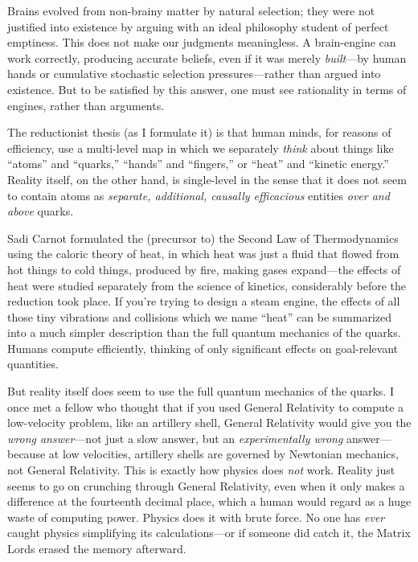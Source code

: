 {
 Brains evolved from non-brainy matter by natural selection; they
were not justified into existence by arguing with an ideal philosophy
student of perfect emptiness. This does not make our judgments
meaningless. A brain-engine can work correctly, producing accurate
beliefs, even if it was merely \textit{built}{}---by human hands or
cumulative stochastic selection pressures---rather than argued into
existence. But to be satisfied by this answer, one must see rationality
in terms of engines, rather than arguments.}

\myendsectiontext


{
 The reductionist thesis (as I formulate it) is that human minds,
for reasons of efficiency, use a multi-level map in which we separately
\textit{think} about things like
``atoms'' and
``quarks,''
``hands'' and
``fingers,'' or
``heat'' and
``kinetic energy.'' Reality itself,
on the other hand, is single-level in the sense that it does not seem
to contain atoms as \textit{separate, additional, causally efficacious}
entities \textit{over and above} quarks. }

{
 Sadi Carnot formulated the (precursor to) the Second Law of
Thermodynamics using the caloric theory of heat, in which heat was just
a fluid that flowed from hot things to cold things, produced by fire,
making gases expand---the effects of heat were studied separately from
the science of kinetics, considerably before the reduction took place.
If you're trying to design a steam engine, the effects
of all those tiny vibrations and collisions which we name
``heat'' can be summarized into a
much simpler description than the full quantum mechanics of the quarks.
Humans compute efficiently, thinking of only significant effects on
goal-relevant quantities.}

{
 But reality itself does seem to use the full quantum mechanics of
the quarks. I once met a fellow who thought that if you used General
Relativity to compute a low-velocity problem, like an artillery shell,
General Relativity would give you the \textit{wrong answer}{}---not
just a slow answer, but an \textit{experimentally wrong}
answer---because at low velocities, artillery shells are governed by
Newtonian mechanics, not General Relativity. This is exactly how
physics does \textit{not} work. Reality just seems to go on crunching
through General Relativity, even when it only makes a difference at the
fourteenth decimal place, which a human would regard as a huge waste of
computing power. Physics does it with brute force. No one has
\textit{ever} caught physics simplifying its calculations---or if
someone did catch it, the Matrix Lords erased the memory afterward.}

